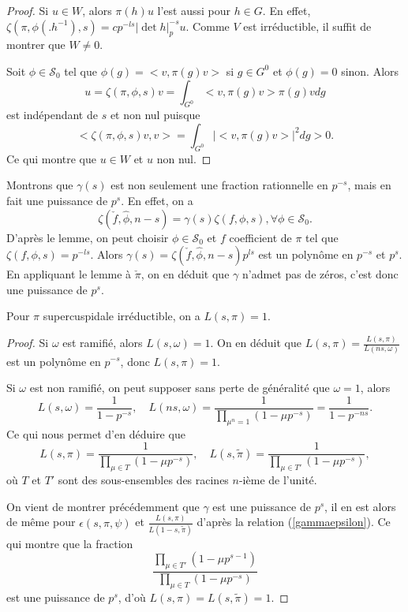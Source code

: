 \begin{proof}
Si $u \in W$, alors $\pi(h)u$ l'est aussi pour $h \in G$. En effet,
$\zeta(\pi,\phi(.h^{-1}),s) = cp^{-ls}|\det h|_p^{-s}u$. Comme $V$ est irréductible, il suffit de montrer que $W \neq 0$.

Soit $\phi \in \mathcal{S}_0$ tel que $\phi(g) = <v, \pi(g)v>$ si $g \in G^0$ et $\phi(g) = 0$ sinon. Alors
\begin{equation}
u=\zeta(\pi, \phi, s)v = \int_{G^0} <v,\pi(g)v>\pi(g)v dg
\end{equation}
est indépendant de $s$ et non nul puisque
\begin{equation}
<\zeta(\pi,\phi,s)v,v> = \int_{G^0} |<v,\pi(g)v>|^2 dg > 0.
\end{equation}
Ce qui montre que $u \in W$ et $u$ non nul.
\end{proof}

Montrons que $\gamma(s)$ est non seulement une fraction rationnelle en $p^{-s}$, mais en fait une puissance de $p^s$. En effet, on a
\begin{equation}
\zeta(\check{f}, \hat{\phi}, n-s)=\gamma(s)\zeta(f,\phi,s), \forall \phi \in \mathcal{S}_0.
\end{equation}
D'après le lemme, on peut choisir $\phi \in \mathcal{S}_0$ et $f$ coefficient de $\pi$ tel que $\zeta(f,\phi,s)=p^{-ls}$. Alors $\gamma(s) = \zeta(\check{f}, \hat{\phi}, n-s)p^{ls}$ est un polynôme en $p^{-s}$ et $p^s$. En appliquant le lemme à $\check{\pi}$, on en déduit que $\gamma$ n'admet pas de zéros, c'est donc une puissance de $p^{s}$.

\begin{proposition}
\label{lfunsupercusp}
Pour $\pi$ supercuspidale irréductible, on a $L(s,\pi)=1$.
\end{proposition}

\begin{proof}
Si $\omega$ est ramifié, alors $L(s,\omega)=1$. On en déduit que
$L(s,\pi)=\frac{L(s,\pi)}{L(ns,\omega)}$ est un polynôme en $p^{-s}$, donc $L(s, \pi)=1$.

Si $\omega$ est non ramifié, on peut supposer sans perte de généralité que $\omega=1$, alors
\begin{equation}
L(s,\omega)=\frac{1}{1-p^{-s}}, \quad L(ns,\omega)=\frac{1}{\prod_{\mu^n=1}(1-\mu p^{-s})}=\frac{1}{1-p^{-ns}}.
\end{equation}
Ce qui nous permet d'en déduire que
\begin{equation}
L(s,\pi) = \frac{1}{\prod_{\mu \in T}(1-\mu p^{-s})}, \quad L(s,\tilde{\pi}) = \frac{1}{\prod_{\mu \in T'}(1-\mu p^{-s})},
\end{equation}
où $T$ et $T'$ sont des sous-ensembles des racines $n$-ième de l'unité.

On vient de montrer précédemment que $\gamma$ est une puissance de $p^s$, il en est alors de même pour $\epsilon(s,\pi,\psi)$ et $\frac{L(s,\pi)}{L(1-s,\tilde{\pi})}$ d'après la relation (\ref{gammaepsilon}). Ce qui montre que la fraction
\begin{equation}
\frac{\prod_{\mu \in T'}(1-\mu p^{s-1})}{\prod_{\mu \in T}(1-\mu p^{-s})}
\end{equation}
est une puissance de $p^s$, d'où $L(s,\pi)=L(s,\tilde{\pi})=1$.
\end{proof}
